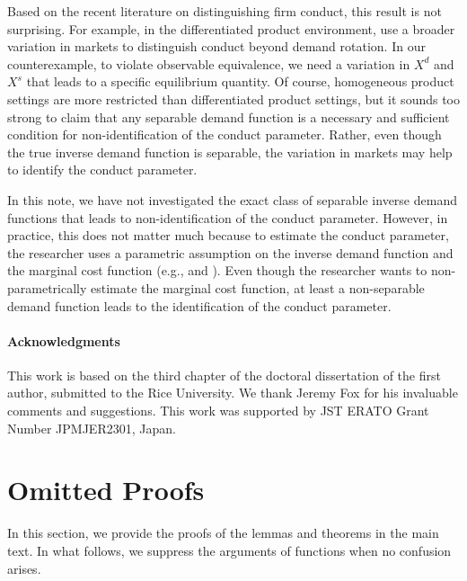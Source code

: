 \documentclass[11pt, a4paper]{article}
\theoremstyle{remark}
\newcommand{\appendixsection}{%
  \setcounter{section}{0}%
  \renewcommand{\thesection}{\Alph{section}}%
  \renewcommand{\thetheorem}{\Alph{section}.\arabic{theorem}}%
  \renewcommand{\thelemma}{\Alph{section}.\arabic{lemma}}%
  \renewcommand{\theproposition}{\Alph{section}.\arabic{proposition}}%
  \renewcommand{\thecorollary}{\Alph{section}.\arabic{corollary}}%
  \renewcommand{\thedefinition}{\Alph{section}.\arabic{definition}}%
}
\begin{document}
Based on the recent literature on distinguishing firm conduct, this result is not surprising.
For example, in the differentiated product environment, \citet{berry2014identification}  use a broader variation in markets to distinguish conduct beyond demand rotation.
In our counterexample, to violate observable equivalence, we need a variation in $X^{d}$ and $X^{s}$ that leads to a specific equilibrium quantity.
Of course, homogeneous product settings are more restricted than differentiated product settings, but it sounds too strong to claim that any separable demand function is a necessary and sufficient condition for non-identification of the conduct parameter.
Rather, even though the true inverse demand function is separable, the variation in markets may help to identify the conduct parameter.

In this note, we have not investigated the exact class of separable inverse demand functions that leads to non-identification of the conduct parameter.
However, in practice, this does not matter much because to estimate the conduct parameter, the researcher uses a parametric assumption on the inverse demand function and the marginal cost function (e.g., \citet{okazaki2022excess} and \citet{matsumura2024loglinear}).
Even though the researcher wants to non-parametrically estimate the marginal cost function, at least a non-separable demand function leads to the identification of the conduct parameter.

\paragraph{Acknowledgments}
This work is based on the third chapter of the doctoral dissertation of the first author, submitted to the Rice University.
We thank Jeremy Fox for his invaluable comments and suggestions.
This work was supported by JST ERATO Grant Number JPMJER2301, Japan.  






\newpage
\appendix
\appendixsection
{}


\section{Omitted Proofs}\label{appendix:proof}
In this section, we provide the proofs of the lemmas and theorems in the main text.
In what follows, we suppress the arguments of functions when no confusion arises.
\end{document}
